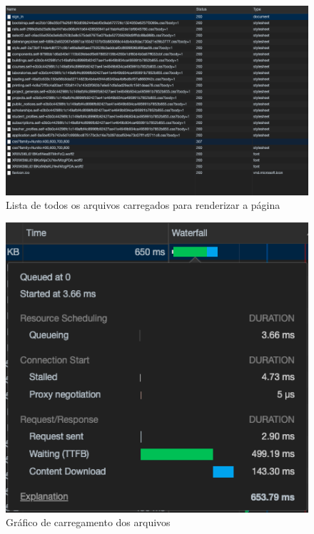 \begin{figure}[htbp]
\hypertarget{arquitetura}{%
\caption{ Lista de todos os arquivos carregados para renderizar a página }
\begin{center}
\includegraphics[width=15cm]{Monografia-FormatoLatex/Imagens/ordem-dos-arquivos-carregados.png}
\end{center}
}
\label{fig:devtools-ordem-de-arquivos}
\end{figure}



\begin{figure}[htbp]
\hypertarget{arquitetura}{%
\caption{ Gráfico de carregamento dos arquivos }
\begin{center}
\includegraphics[width=15cm]{Monografia-FormatoLatex/Imagens/informacoes-do-waterfall.png}
\end{center}
}
\label{fig:devtools-waterfall}
\end{figure}



